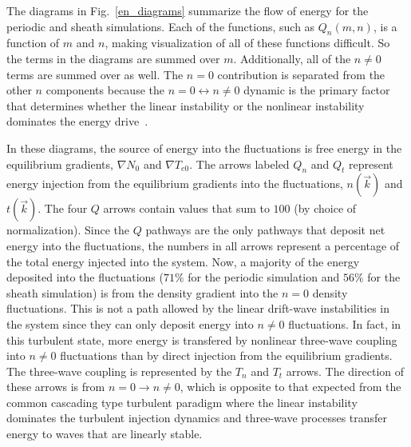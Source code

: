 \documentclass[showpacs,preprintnumbers,amsmath,amssymb,superscriptaddress,aip]{revtex4-1}
\begin{document}
The diagrams in Fig.~\ref{en_diagrams} summarize the flow of energy for the periodic and sheath simulations. Each of the functions, such as $Q_n(m,n)$, is a function of $m$ and $n$, making
visualization of all of these functions difficult. So the terms in the diagrams are summed over $m$. Additionally, all of the $n \ne 0$ terms are summed over as well.
The $n=0$ contribution is separated from the other $n$ components because
the $n=0 \leftrightarrow n \ne 0$ dynamic is the primary factor that determines whether the linear instability or the nonlinear instability dominates the energy drive~\cite{friedman2012b}.

In these diagrams, the source of energy into the fluctuations is free energy in the equilibrium gradients, 
$\nabla N_0$ and $\nabla T_{e0}$. The arrows labeled $Q_n$ and $Q_t$ represent energy injection from
the equilibrium gradients into the fluctuations, $n(\vec{k})$ and $t(\vec{k})$. The four $Q$ arrows contain values that sum to $100$ (by choice of normalization). 
Since the $Q$ pathways are the only pathways that deposit
net energy into the fluctuations, the numbers in all arrows represent a percentage of the total energy injected into the system.
Now, a majority of the energy deposited into the fluctuations ($71\%$ for the periodic simulation and $56\%$ for the sheath simulation)
is from the density gradient into the $n=0$ density fluctuations. This is not a path allowed by the linear drift-wave instabilities in the system since
they can only deposit energy into $n \ne 0$ fluctuations.
In fact, in this turbulent state, more energy is transfered by nonlinear three-wave coupling into $n \ne 0$ fluctuations than by direct injection from the equilibrium gradients. The three-wave
coupling is represented by the $T_n$ and $T_t$ arrows. The direction of these arrows is from $n=0 \rightarrow n \ne 0$, which is opposite to that expected from the common cascading type 
turbulent paradigm where the linear instability dominates the turbulent injection dynamics and three-wave processes transfer energy to waves that are linearly stable.
\end{document}
